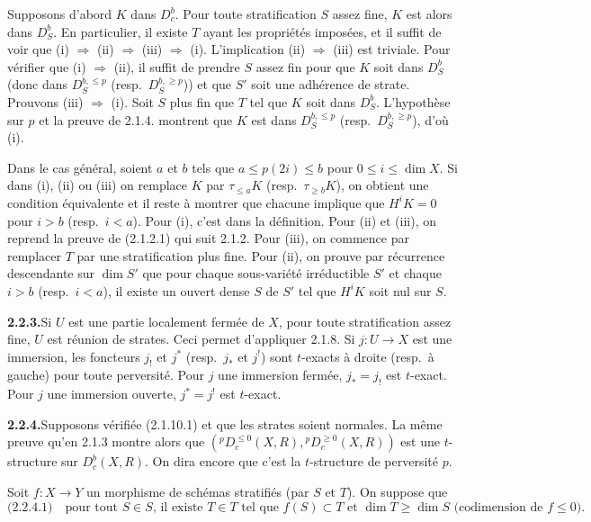 \documentclass[12pt,a4paper]{article}
\theoremstyle{plain}
\theoremstyle{definition}
\begin{document}
Supposons d'abord $K$ dans $D_c^b$. Pour toute stratification $S$ assez fine, $K$ est alors dans $D_S^b$. En particulier, il existe $T$ ayant les propri\'et\'es impos\'ees, et il suffit de voir que (i) $\Rightarrow$ (ii) $\Rightarrow$ (iii) $\Rightarrow$ (i). L'implication (ii) $\Rightarrow$ (iii) est triviale. Pour v\'erifier que (i) $\Rightarrow$ (ii), il suffit de prendre $S$ assez fin pour que $K$ soit dans $D_S^b$ (donc dans $D_S^{b, \leqslant p}$ (resp.\ $D_S^{b, \geqslant p}$)) et que $S'$ soit une adh\'erence de strate. Prouvons (iii) $\Rightarrow$ (i). Soit $S$ plus fin que $T$ tel que $K$ soit dans $D_S^b$. L'hypoth\`ese sur $p$ et la preuve de 2.1.4. montrent que $K$ est dans $D_S^{b, \leqslant p}$ (resp.\ $D_S^{b, \geqslant p}$), d'o\`u (i).

Dans le cas g\'en\'eral, soient $a$ et $b$ tels que $a \leqslant p(2i) \leqslant b$ pour $0 \leqslant i \leqslant \dim X$. Si dans (i), (ii) ou (iii) on remplace $K$ par $\tau_{\leqslant a} K$ (resp.\ $\tau_{\geqslant b} K$), on obtient une condition \'equivalente et il reste \`a montrer que chacune implique que $H^i K = 0$ pour $i > b$ (resp.\ $i < a$). Pour (i), c'est dans la d\'efinition. Pour (ii) et (iii), on reprend la preuve de (2.1.2.1) qui suit 2.1.2. Pour (iii), on commence par remplacer $T$ par une stratification plus fine. Pour (ii), on prouve par r\'ecurrence descendante sur $\dim S'$ que pour chaque sous-vari\'et\'e irr\'eductible $S'$ et chaque $i > b$ (resp.\ $i < a$), il existe un ouvert dense $S$ de $S'$ tel que $H^i K$ soit nul sur $S$.

\smallskip
\noindent\textbf{2.2.3.}\quad Si $U$ est une partie localement ferm\'ee de $X$, pour toute stratification assez fine, $U$ est r\'eunion de strates. Ceci permet d'appliquer 2.1.8. Si $j : U \to X$ est une immersion, les foncteurs $j_!$ et $j^*$ (resp.\ $j_*$ et $j^!$) sont $t$-exacts \`a droite (resp.\ \`a gauche) pour toute perversit\'e. Pour $j$ une immersion ferm\'ee, $j_* = j_!$ est $t$-exact. Pour $j$ une immersion ouverte, $j^* = j^!$ est $t$-exact.

\smallskip
\noindent\textbf{2.2.4.}\quad Supposons v\'erifi\'ee (2.1.10.1) et que les strates soient normales. La m\^eme preuve qu'en 2.1.3 montre alors que $({}^p D_c^{\leqslant 0}(X, R), {}^p D_c^{\geqslant 0}(X, R))$ est une $t$-structure sur $D_c^b(X, R)$. On dira encore que c'est la $t$-structure de perversit\'e $p$.

Soit $f : X \to Y$ un morphisme de sch\'emas stratifi\'es (par $S$ et $T$). On suppose que
\[
\text{(2.2.4.1)}\quad\text{pour tout } S \in S\text{, il existe } T \in T\text{ tel que } f(S) \subset T\text{ et } \dim T \geqslant \dim S\text{ (codimension de }f \leqslant 0\text{).}
\]
\end{document}
